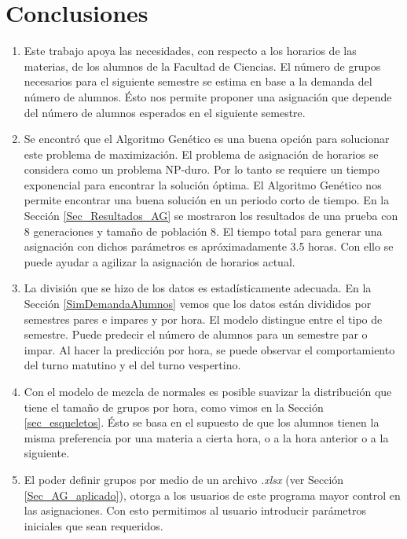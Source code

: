 \chapter{Conclusiones}

\begin{enumerate}
\item Este trabajo apoya las necesidades, con respecto a los horarios de las materias, de los alumnos de la Facultad de Ciencias. El número de grupos necesarios para el siguiente semestre se estima en base a la demanda del número de alumnos. Ésto nos permite proponer una asignación que depende del número de alumnos esperados en el siguiente semestre.

\item Se encontró que el Algoritmo Genético es una buena opción para solucionar este problema de maximización. El problema de asignación de horarios se considera como un problema NP-duro. Por lo tanto se requiere un tiempo exponencial para encontrar la solución óptima. El Algoritmo Genético nos permite encontrar una buena solución en un periodo corto de tiempo. En la Sección \ref{Sec_Resultados_AG} se mostraron los resultados de una prueba con 8 generaciones y tamaño de población 8. El tiempo total para generar una asignación con dichos parámetros es apróximadamente 3.5 horas. Con ello se puede ayudar a agilizar la asignación de horarios actual.%

\item La división que se hizo de los datos es estadísticamente adecuada. En la Sección \ref{SimDemandaAlumnos} vemos que los datos están divididos por semestres pares e impares y por hora. El modelo distingue entre el tipo de semestre. Puede predecir el número de alumnos para un semestre par o impar. Al hacer la predicción por hora, se puede observar el comportamiento del turno matutino y el del turno vespertino.

\item Con el modelo de mezcla de normales es posible suavizar la distribución que tiene el tamaño de grupos por hora, como vimos en la Sección \ref{sec_esqueletos}. Ésto se basa en el supuesto de que los alumnos tienen la misma preferencia por una materia a cierta hora, o a la hora anterior o a la siguiente. %

\item El poder definir grupos por medio de un archivo \textit{.xlsx} (ver Sección \ref{Sec_AG_aplicado}), otorga a los usuarios de este programa mayor control en las asignaciones. Con esto permitimos al usuario introducir parámetros iniciales que sean requeridos.


\end{enumerate}

